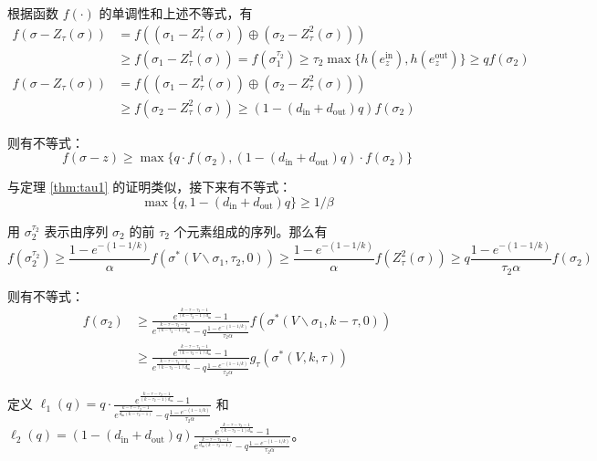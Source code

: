 根据函数 $f(\cdot)$ 的单调性和上述不等式，有
\begin{align}
f(\sigma- Z_\tau(\sigma)) & = f((\sigma_1 - Z_\tau^1(\sigma)) \oplus (\sigma_2 - Z_\tau^2(\sigma))) \\ &\ge f(\sigma_1 - Z_\tau^1(\sigma)) = f(\sigma_1^{\tau_2}) \ge \tau_2 \max \{h(e_z^{\text{in}}),h(e_z^{\text{out}})\} \ge q f(\sigma_2) \\
f(\sigma-Z_\tau(\sigma)) & = f((\sigma_1 - Z_\tau^1(\sigma)) \oplus (\sigma_2 - Z_\tau^2(\sigma))) \\ & \ge f(\sigma_2 -Z_\tau^2(\sigma)) \ge (1-(d_{\text{in}} + d_{\text{out}})q) f(\sigma_2)
\end{align}

则有不等式：
\begin{equation}
f(\sigma-z)\ge \max\{ q \cdot f(\sigma_2),(1-(d_{\text{in}} + d_{\text{out}})q) \cdot f(\sigma_2)\} \label{equ:tau2_ine1}
\end{equation}

与定理 \ref{thm:tau1} 的证明类似，接下来有不等式：
\begin{equation}
    \max\{q,1-(d_{\text{in}} + d_{\text{out}})q\} \ge 1/\beta \label{equ:tau2_ine2}
\end{equation}

用 $\sigma_2^{\tau_2}$ 表示由序列 $\sigma_2$ 的前 $\tau_2$ 个元素组成的序列。那么有
\begin{equation}
f(\sigma_2^{\tau_2}) \ge \frac{1-e^{-(1-1/k)}}{\alpha} f(\sigma^*(V\backslash \sigma_1,\tau_2,0)) \ge  \frac{1-e^{-(1-1/k)}}{\alpha} f(Z_\tau^2(\sigma)) \ge q \frac{1-e^{-(1-1/k)}}{\tau_2 \alpha} f(\sigma_2)
\end{equation}

则有不等式：
\begin{align}
f(\sigma_2) &\ge \frac{e^{\frac{k-\tau-\tau_2-1}{(k-\tau_2-1)d_{\text{in}}}}-1}{e^{\frac{k-\tau-\tau_2-1}{(k-\tau_2-1)d_{\text{in}}}}- q \frac{1-e^{-(1-1/k)}}{\tau_2\alpha} } f(\sigma^*(V\backslash \sigma_1,k-\tau,0)) \\& \ge \frac{e^{\frac{k-\tau-\tau_2-1}{(k-\tau_2-1)d_{\text{in}}}}-1}{e^{\frac{k-\tau-\tau_2-1}{(k-\tau_2-1)d_{\text{in}}}}- q \frac{1-e^{-(1-1/k)}}{\tau_2\alpha} } g_\tau(\sigma^*(V,k,\tau)) \label{equ:tau2_ine3}
\end{align}

定义 $\ell_1(q) = q \cdot \frac{e^{\frac{k-\tau-\tau_2-1}{(k-\tau_2-1)d_{\text{in}}}}-1}{e^{\frac{k-\tau-\tau_2-1}
{d_{\text{in}}(k-\tau_2-1)}}-q \frac{1-e^{-(1-1/k)}}{\tau_2\alpha} }$ 和 $\ell_2(q) = (1-(d_{\text{in}} + d_{\text{out}})q) \frac{e^{\frac{k-\tau-\tau_2-1}{(k-\tau_2-1)d_{\text{in}}}}-1}{e^{\frac{k-\tau-\tau_2-1}
{d_{\text{in}}(k-\tau_2-1)}}-q \frac{1-e^{-(1-1/k)}}{\tau_2\alpha} }$。


